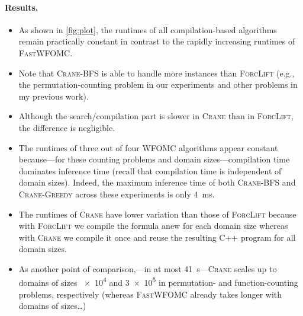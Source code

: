 \documentclass{article}
\theoremstyle{definition}
\begin{document}
\paragraph{Results.}
\begin{itemize}
  \item As shown in \cref{fig:plot}, the runtimes of all compilation-based
        algorithms remain practically constant in contrast to the rapidly
        increasing runtimes of \textsc{FastWFOMC}.
  \item Note that \textsc{Crane-BFS} is able to handle more instances than
        \textsc{ForcLift} (e.g., the permutation-counting problem in our
        experiments and other problems in my previous work).
  \item Although the search/compilation part is slower in \textsc{Crane} than in
        \textsc{ForcLift}, the difference is negligible.
  \item The runtimes of three out of four WFOMC algorithms appear constant
        because---for these counting problems and domain sizes---compilation
        time dominates inference time (recall that compilation time is
        independent of domain sizes). Indeed, the maximum inference time of both
        \textsc{Crane-BFS} and \textsc{Crane-Greedy} across these experiments is
        only \SI{4}{\milli\second}.
  \item The runtimes of \textsc{Crane} have lower variation than those of
        \textsc{ForcLift} because with \textsc{ForcLift} we compile the formula
        anew for each domain size whereas with \textsc{Crane} we compile it once
        and reuse the resulting C++ program for all domain sizes.
  \item As another point of comparison,---in at most
        \SI{41}{\second}---\textsc{Crane} scales up to domains of sizes \num{e4}
        and \num{3e5} in permutation- and function-counting problems,
        respectively (whereas \textsc{FastWFOMC} already takes longer with
        domains of sizes\dots)
\end{itemize}
\end{document}

